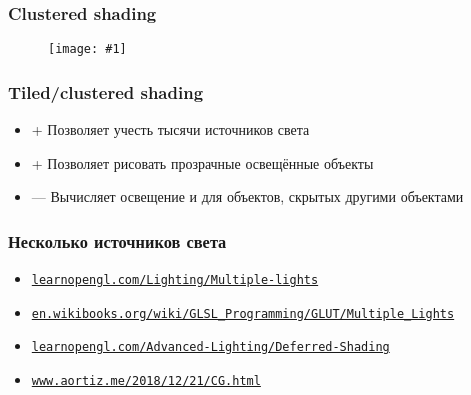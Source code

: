 \documentclass{beamer}
\newcommand{\slideimage}[1]{
  \begin{figure}
    \begin{adjustbox}{width=\textwidth, totalheight=\textheight-2\baselineskip-2\baselineskip,keepaspectratio}
      \texttt{[image: \#1]}
    \end{adjustbox}
  \end{figure}
}
\begin{document}
\begin{frame}[fragile]
\frametitle{Clustered shading}
\slideimage{clustered_mars.png}
\end{frame}

\begin{frame}[fragile]
\frametitle{Tiled/clustered shading}
\begin{itemize}
\item {\color{green}+} Позволяет учесть тысячи источников света
\item {\color{green}+} Позволяет рисовать прозрачные освещённые объекты
\item {\color{red}—} Вычисляет освещение и для объектов, скрытых другими объектами
\end{itemize}
\end{frame}

\begin{frame}[fragile]
\frametitle{Несколько источников света}
\begin{itemize}
\item \href{https://learnopengl.com/Lighting/Multiple-lights}{\nolinkurl{learnopengl.com/Lighting/Multiple-lights}}
\item \href{https://en.wikibooks.org/wiki/GLSL_Programming/GLUT/Multiple_Lights}{\nolinkurl{en.wikibooks.org/wiki/GLSL\_Programming/GLUT/Multiple\_Lights}}
\item \href{https://learnopengl.com/Advanced-Lighting/Deferred-Shading}{\nolinkurl{learnopengl.com/Advanced-Lighting/Deferred-Shading}}
\item \href{http://www.aortiz.me/2018/12/21/CG.html}{\nolinkurl{www.aortiz.me/2018/12/21/CG.html}}
\end{itemize}
\end{frame}
\end{document}
